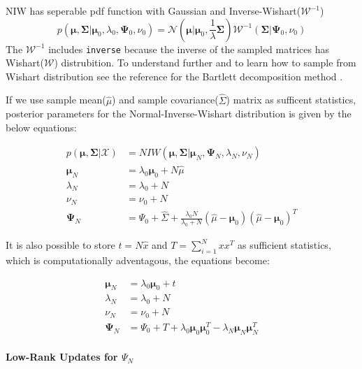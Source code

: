 \documentclass[a4paper]{article}
\begin{document}
NIW has seperable pdf function with Gaussian and
Inverse-Wishart(\(\mathcal{W}^{-1}\))
\begin{equation*}
p(\boldsymbol\mu,\boldsymbol\Sigma|\boldsymbol\mu_0,\lambda_0,\boldsymbol\Psi_0,\nu_0) = \mathcal{N}\left(\boldsymbol\mu\Big|\boldsymbol\mu_0,\frac{1}{\lambda}\boldsymbol\Sigma\right) \mathcal{W}^{-1}(\boldsymbol\Sigma|\boldsymbol\Psi_0,\nu_0)
\end{equation*}
The \(\mathcal{W}^{-1}\) includes \texttt{inverse} because the inverse
of the sampled matrices has Wishart(\(\mathcal{W}\)) distrubition. To
understand further and to learn how to sample from Wishart distribution
see the reference for the Bartlett decomposition method \cite{wishart1928generalised}.

If we use sample mean(\(\hat{\mu}\)) and sample
covariance(\(\hat{\Sigma}\)) matrix as sufficent statistics, posterior
parameters for the Normal-Inverse-Wishart distribution is given by the
below equations\cite{kamper2013gibbs}:

\begin{align*}
p(\boldsymbol\mu,\boldsymbol\Sigma|\mathcal{X}) & = NIW(\boldsymbol\mu,\boldsymbol\Sigma| \boldsymbol  \mu_N,  \boldsymbol  \Psi_N, \lambda_N, \nu_N)  \\
\boldsymbol \mu_N & = \lambda_0 \boldsymbol \mu_0 + N \hat{\mu} \\
\lambda_N & = \lambda_0 + N \\
\nu_N & = \nu_0 + N \\
\boldsymbol \Psi_N &=  \Psi_0 + \hat{\Sigma} + \frac{\lambda_0N}{\lambda_0+N}(\hat{\mu}-\boldsymbol \mu_0)(\hat{\mu}-\boldsymbol \mu_0)^T
\end{align*}

It is also possible to store \(t =N\hat{x}\) and \(T=\sum_{i=1}^Nxx^T\)
as sufficient statistics, which is computationally adventagous, the
equations become:

\begin{align*}
\boldsymbol \mu_N & = \lambda_0 \boldsymbol \mu_0 + t \\
\lambda_N & = \lambda_0 + N \\
\nu_N & = \nu_0 + N \\
\boldsymbol \Psi_N &=  \Psi_0 + T + \lambda_0\boldsymbol\mu_0\boldsymbol\mu_0^T-\lambda_N\boldsymbol\mu_N\boldsymbol\mu_N ^T
\end{align*}


\paragraph{\texorpdfstring{Low-Rank Updates for
\(\Psi_N\)}{Low-Rank Updates for \textbackslash Psi\_N}}
\end{document}
